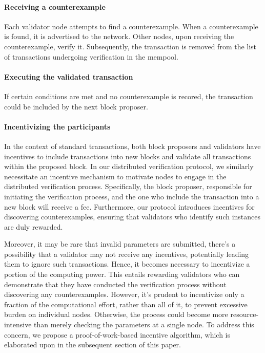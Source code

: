 \documentclass[runningheads]{llncs}
\begin{document}
\paragraph{Receiving a counterexample} Each validator node attempts to find a counterexample. When a counterexample is found, it is advertised to the network. Other nodes, upon receiving the counterexample, verify it. Subsequently, the transaction is removed from the list of transactions undergoing verification in the mempool. 
\paragraph{Executing the validated transaction} If certain conditions are met and no counterexample is recored, the transaction could be included by the next block proposer.
\paragraph{Incentivizing the participants}  In the context of standard transactions, both block proposers and validators have incentives to include transactions into new blocks and validate all transactions within the proposed block. In our distributed verification protocol, we similarly necessitate an incentive mechanism to motivate nodes to engage in the distributed verification process. Specifically, the block proposer, responsible for initiating the verification process, and the one who include the transaction into a new block will receive a fee. Furthermore, our protocol introduces incentives for discovering counterexamples, ensuring that validators who identify such instances are duly rewarded.

Moreover, it may be rare that invalid parameters are submitted, there's a possibility that a validator may not receive any incentives, potentially leading them to ignore such transactions. Hence, it becomes necessary to incentivize a portion of the computing power. This entails rewarding validators who can demonstrate that they have conducted the verification process without discovering any counterexamples. However, it's prudent to incentivize only a fraction of the computational effort, rather than all of it, to prevent excessive burden on individual nodes. Otherwise, the process could become more resource-intensive than merely checking the parameters at a single node. To address this concern, we propose a proof-of-work-based incentive algorithm, which is elaborated upon in the subsequent section of this paper.
\end{document}
